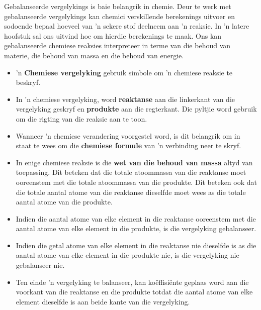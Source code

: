 Gebalanseerde vergelykings is baie belangrik in chemie. Deur te werk met gebalanseerde vergelykings kan chemici  verskillende berekenings uitvoer en sodoende bepaal hoeveel van  'n sekere stof deelneem aan  'n reaksie. In 'n latere hoofstuk sal ons uitvind hoe om hierdie berekenings te maak. Ons kan gebalanseerde chemiese reaksies interpreteer in terme van die behoud van materie, die behoud van massa en die behoud van energie.

            \nopagebreak
      \label{m38727*id67171}\begin{itemize}[noitemsep]
            \label{m38727*uid36}\item 'n \textbf{Chemiese vergelyking} gebruik simbole om 'n chemiese reaksie te beskryf.
\label{m38727*uid37}\item In 'n chemiese vergelyking, word \textbf{reaktanse} aan die linkerkant van die vergelyking geskryf en \textbf{produkte} aan die regterkant. Die pyltjie word gebruik om die rigting van die reaksie aan te toon.
\label{m38727*uid38}\item Wanneer  'n chemiese verandering voorgestel word, is dit belangrik om in staat te wees om die \textbf{chemiese formule} van  'n verbinding neer te skryf.
\label{m38727*uid39}\item In enige chemiese reaksie is die \textbf{wet van die behoud van massa} altyd van toepassing. Dit beteken dat die totale atoommassa van die reaktanse moet ooreenstem met die totale atoommassa van die produkte. Dit beteken ook dat die totale aantal atome van die reaktanse dieselfde moet wees as die totale aantal atome van die produkte.
\label{m38727*uid41}\item Indien die aantal atome van elke element in die reaktanse ooreenstem met die aantal atome van elke element in die produkte, is die vergelyking gebalanseer.
\label{m38727*uid42}\item Indien die getal atome van elke element in die reaktanse nie dieselfde is as die aantal atome van elke element in die produkte nie, is die vergelyking nie gebalanseer nie.
\item Ten einde 'n vergelyking te balanseer,  kan koëffisiënte geplaas word aan die voorkant van die reaktanse en die  produkte totdat die aantal atome van elke element dieselfde is aan beide kante van die vergelyking.
\end{itemize}


